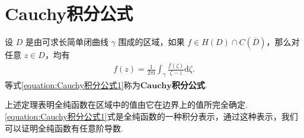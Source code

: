 \documentclass[../../main.tex]{subfiles}%
\begin{document}
\section{Cauchy积分公式}

\begin{theorem}[Cauchy积分公式]\label{theorem:复变-Cauchy积分公式}
设 \( D \) 是由可求长简单闭曲线 \( \gamma \) 围成的区域，如果 \( f \in H(D) \cap C(\overline{D}) \)，那么对任意 \( z \in D \)，均有
\begin{align}\label{equation:Cauchy积分公式1}
f(z) = \frac{1}{2\pi \mathrm{i}} \int_{\gamma} \frac{f(\zeta)}{\zeta - z} \mathrm{d}\zeta.
\end{align}
等式\eqref{equation:Cauchy积分公式1}称为$\mathbf{Cauchy}$\textbf{积分公式}.
\end{theorem}
\begin{note}
上述定理表明全纯函数在区域中的值由它在边界上的值所完全确定. \eqref{equation:Cauchy积分公式1}式是全纯函数的一种积分表示，通过这种表示，我们可以证明全纯函数有任意阶导数.
\end{note}
\end{document}
